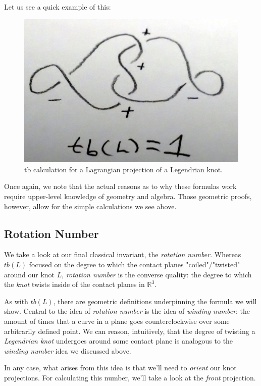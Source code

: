 \documentclass{article}
\begin{document}
Let us see a quick example of this:

\begin{figure}[h!]
    \includegraphics[width=\linewidth]{tbLagr.jpg}
    \caption{tb calculation for a Lagrangian projection of a Legendrian knot.}
    \label{fig:knot1}
\end{figure}


Once again, we note that the actual reasons as to why these formulas work require
upper-level knowledge of geometry and algebra. Those geometric proofs, however,
allow for the simple calculations we see above.

\subsection{Rotation Number}
We take a look at our final classical invariant, the \textit{rotation number}.
Whereas $tb(L)$ focused on the degree to which the contact planes "coiled"/"twisted"
around our knot $L$, \textit{rotation number} is the converse quality: the degree
to which the \textit{knot} twists inside of the contact planes in $\mathbb{R}^3$.

As with $tb(L)$, there are geometric definitions underpinning the formula we will
show. Central to the idea of \textit{rotation number} is the idea of \textit{winding number}:
the amount of times that a curve in a plane goes counterclockwise over some arbitrarily defined
point. We can reason, intuitively, that the degree of twisting a \textit{Legendrian knot} undergoes
around some contact plane is analogous to the \textit{winding number} idea we discussed above.

In any case, what arises from this idea is that we'll need to \textit{orient} our knot projections.
For calculating this number, we'll take a look at the \textit{front} projection.
\end{document}

